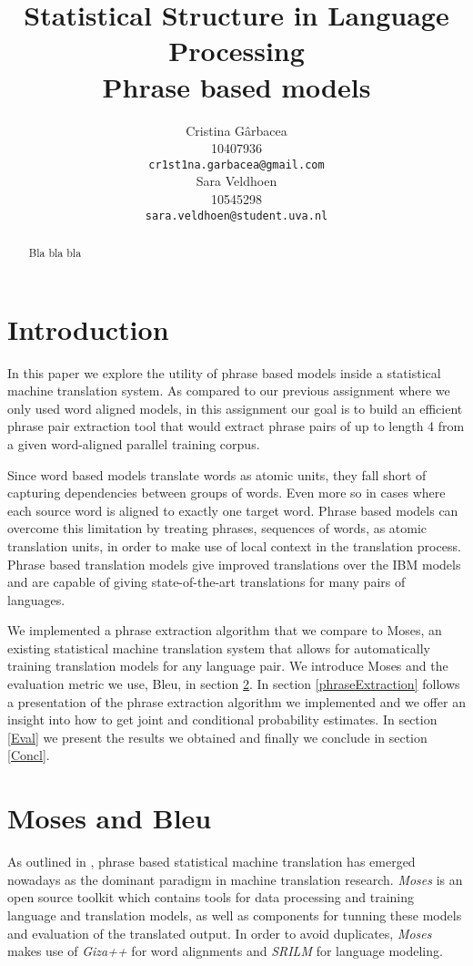 \documentclass[11pt]{article}
\title{Statistical Structure in Language Processing \\ Phrase based models}
\author{ Cristina G\^arbacea\\
  10407936 \\
  {\small \tt cr1st1na.garbacea@gmail.com} 
  \\\And
  Sara Veldhoen \\
10545298   \\
  {\small \tt sara.veldhoen@student.uva.nl} \\}
\date{}
\begin{document}
\maketitle

\begin{abstract}
Bla bla bla
\end{abstract}

\section{Introduction}
In this paper we explore the utility of phrase based models inside a statistical machine translation system. As compared to our previous assignment where we only used word aligned models, in this assignment our goal is to build an efficient phrase pair extraction tool that would extract phrase pairs of up to length 4 from a given word-aligned parallel training corpus. 

Since word based models translate words as atomic units, they fall short of capturing dependencies between groups of words. 
Even more so in cases where each source word is aligned to exactly one target word.
 Phrase based models can overcome this limitation by treating phrases, sequences of words, as atomic translation units, in order to make use of local context in the translation process. Phrase based translation models give improved translations over the IBM models and are capable of giving state-of-the-art translations for many pairs of languages.


We implemented a phrase extraction algorithm that we compare to Moses, an existing statistical machine translation system that allows for automatically training translation models for any language pair. We introduce Moses and the evaluation metric we use, Bleu, in section \ref{existing}. In section \ref{phraseExtraction} follows a presentation of the phrase extraction algorithm we implemented and we offer an insight into how to get joint and conditional probability estimates.
In section \ref{Eval} we present the results we obtained and finally we conclude in section \ref{Concl}.

\section{Moses and Bleu}
\label{existing}
As outlined in \cite{moses}, phrase based statistical machine translation has emerged nowadays as the dominant paradigm in machine translation research. \textit{Moses} \cite{mosesurl} is an open source toolkit which contains tools for data processing and training language and translation models, as well as components for tunning these models and evaluation of the translated output. In order to avoid duplicates, \textit{Moses} makes use of \textit{Giza++} \cite{giza++} for word alignments and \textit{SRILM} \cite{srilm} for language modeling. 
\end{document}
